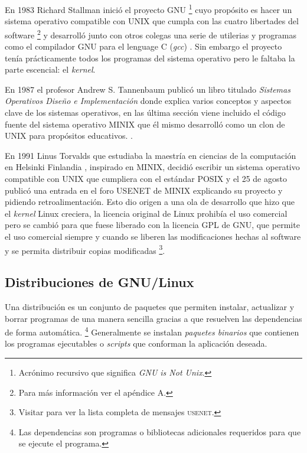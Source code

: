 En 1983 Richard Stallman inici\'{o} el proyecto \textsc{GNU} \footnote{Acr\'{o}nimo recursivo que significa \textit{GNU is Not Unix}.} cuyo prop\'{o}sito es hacer un sistema operativo compatible con \textsc{UNIX} que cumpla con las cuatro libertades del software \footnote{Para m\'{a}s informaci\'{o}n ver el ap\'{e}ndice A.} y desarroll\'{o} junto con otros colegas una serie de utilerias y programas como el compilador \textsc{GNU} para el lenguage \textsc{C} (\textit{gcc}) \cite{_about_????}. Sin embargo el proyecto ten\'{i}a pr\'{a}cticamente todos los programas del sistema operativo pero le faltaba la parte escencial: el \textit{kernel}.

En 1987 el profesor Andrew S. Tannenbaum public\'{o} un libro titulado \textit{Sistemas Operativos Dise\~{n}o e Implementaci\'{o}n} \cite{tanenbaum_operating_2006} donde explica varios conceptos y aspectos clave de los sistemas operativos, en las \'{u}ltima secci\'{o}n viene incluido el c\'{o}digo fuente del sistema operativo \textsc{MINIX} que \'{e}l mismo desarroll\'{o} como un clon de \textsc{UNIX} para prop\'{o}sitos educativos. \cite{_complete_????}.

En 1991 Linus Torvalds que estudiaba la maestr\'{i}a en ciencias de la computaci\'{o}n en Helsinki Finlandia \cite{_staff_????}, inspirado en \textsc{MINIX}, decidi\'{o} escribir un sistema operativo compatible con UNIX que cumpliera con el est\'{a}ndar \textsc{POSIX} y el 25 de agosto public\'{o} una entrada en el foro \textsc{USENET} de \textsc{MINIX} \cite{_history_????} explicando su proyecto y pidiendo retroalimentaci\'{o}n. Esto dio origen a una ola de desarrollo que hizo que el \textit{kernel} Linux creciera, la licencia original de Linux prohib\'{i}a el uso comercial pero se cambi\'{o} para que fuese liberado con la licencia \textsc{GPL} de \textsc{GNU}, que permite el uso comercial siempre y cuando se liberen las modificaciones hechas al software y se permita distribuir copias modificadas \cite{_linux_????-3} \footnote{Visitar \cite{_linuxs_????} para ver la lista completa de mensajes \textsc{usenet}.}.

  \subsection {Distribuciones de GNU/Linux}

Una distribuci\'{o}n es un conjunto de paquetes que permiten instalar, actualizar y borrar programas de una manera sencilla gracias a que resuelven las dependencias de forma autom\'{a}tica. \footnote{Las dependencias son programas o bibliotecas adicionales requeridos para que se ejecute el programa.} Generalmente se instalan \textit{paquetes binarios} que contienen los programas ejecutables o \textit{scripts} que conforman la aplicaci\'{o}n deseada.

